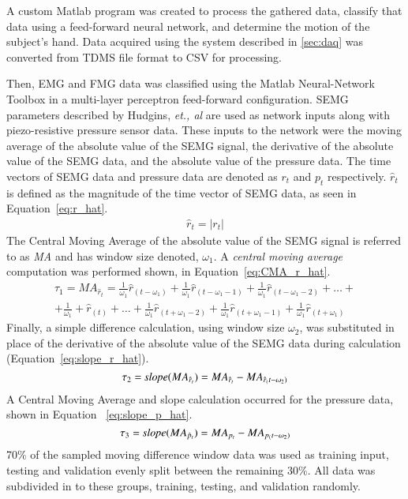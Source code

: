 \documentclass[twocolumn]{sagej}
\begin{document}
A custom Matlab program was created to process the gathered data, classify that data using a feed-forward neural network, and determine the motion of the subject's hand.  Data acquired using the system described in \ref{sec:daq} was converted from TDMS file format to CSV for processing.  \par \noindent
Then, EMG and FMG data was classified using the Matlab Neural-Network Toolbox in a multi-layer perceptron feed-forward configuration.  SEMG parameters described by Hudgins, \textit{et., al} are used as network inputs along with piezo-resistive pressure sensor data\cite{Hudgins01993}.  These inputs to the network were the moving average of the absolute value of the SEMG signal, the derivative of the absolute value of the SEMG data, and the absolute value of the pressure data. The time vectors of SEMG data and pressure data are denoted as $r_{t}$ and $p_{t}$ respectively. $\hat{r}_t$ is defined as the magnitude of the time vector of SEMG data, as seen in Equation~\ref{eq:r_hat}.
\begin{align}
\label{eq:r_hat}
\hat{r}_t = \lvert r_t \rvert
\end{align}
The Central Moving Average of the absolute value of the SEMG signal is referred to as \textit{MA} and has window size denoted, $\omega_1$.  A \textit{central moving average} computation was performed shown, in Equation~\ref{eq:CMA_r_hat}.  
\begin{align}
\label{eq:CMA_r_hat}
\tau_1 = MA_{\hat{r}_t} = \frac{1}{\omega_1}\hat{r}_{(t-\omega_1)} + \frac{1}{\omega_1}\hat{r}_{(t-\omega_1-1)} + \frac{1}{\omega_1}\hat{r}_{(t-\omega_1-2)} + \ldots + \nonumber \\
+ \frac{1}{\omega_1} + \hat{r}_{(t)} + \ldots + \frac{1}{\omega_1}\hat{r}_{(t+\omega_1-2)} + \frac{1}{\omega_1}\hat{r}_{(t+\omega_1-1)} + \frac{1}{\omega_1}\hat{r}_{(t+\omega_1)}
\end{align}
Finally, a simple difference calculation, using window size $\omega_2$, was substituted in place of the derivative of the absolute value of the SEMG data during calculation (Equation~\ref{eq:slope_r_hat}).  
\begin{equation}
\label{eq:slope_r_hat}
\tau_2 = \textit{slope}(MA_{\hat{r}_t}) = MA_{\hat{r}_t} - MA_{\hat{r}_(t-\omega_2)}\\
\end{equation}
A Central Moving Average and slope calculation occurred for the pressure data, shown in Equation ~\ref{eq:slope_p_hat}.  
\begin{equation}
\label{eq:slope_p_hat}
	\tau_3 = \textit{slope}(MA_{\hat{p}_t}) = MA_{{p}_t} - MA_{{p}_(t-\omega_2)}\\
\end{equation}
70$\%$ of the sampled moving difference window data was used as training input, testing and validation evenly split between the remaining 30$\%$.  All data was subdivided in to these groups, training, testing, and validation randomly. \par \noindent
\end{document}
